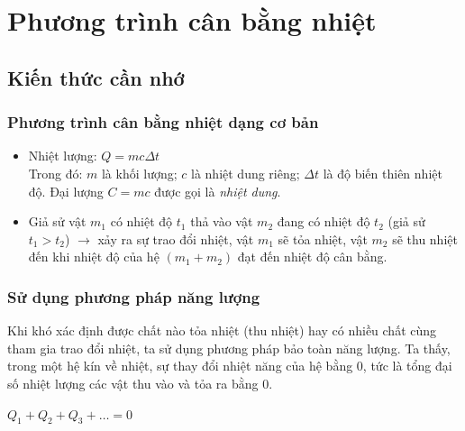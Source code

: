 \section{Phương trình cân bằng nhiệt}
\subsection{Kiến thức cần nhớ}
\begin{khung}
	\subsubsection{Phương trình cân bằng nhiệt dạng cơ bản}
	\begin{itemize}
		\item Nhiệt lượng: $Q = mc\Delta t$\\ 
		Trong đó: $m$ là khối lượng; $c$ là nhiệt dung riêng; $\Delta t$ là độ biến thiên nhiệt độ. Đại lượng $C = mc$ được gọi là \textit{nhiệt dung}.
		\item Giả sử vật $m_{1}$ có nhiệt độ $t_{1}$ thả vào vật $m_{2}$ đang có nhiệt độ $t_{2}$ (giả sử $t_{1} > t_{2}$) $\to$ xảy ra sự trao đổi nhiệt, vật $m_{1}$ sẽ tỏa nhiệt, vật $m_{2}$ sẽ thu nhiệt đến khi nhiệt độ của hệ $(m_{1} + m_{2})$ đạt đến nhiệt độ cân bằng.
		
	\end{itemize}
	\subsubsection{Sử dụng phương pháp năng lượng} 
	Khi khó xác định được chất nào tỏa nhiệt (thu nhiệt) hay có nhiều chất cùng tham gia trao đổi nhiệt, ta sử dụng phương pháp bảo toàn năng lượng. Ta thấy, trong một hệ kín về nhiệt, sự thay đổi nhiệt năng của hệ bằng $0$, tức là tổng đại số nhiệt lượng các vật thu vào và tỏa ra bằng $0$.
	\hspace{1pt}
	\begin{center}
		$Q_{1} + Q_{2} + Q_{3} + \ldots = 0$
	\end{center}
	
\end{khung}
